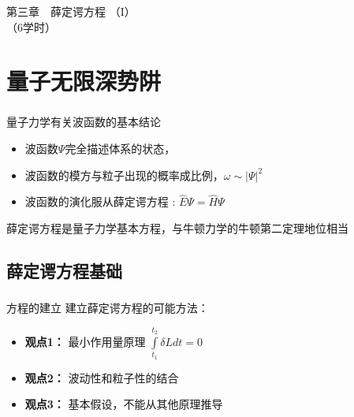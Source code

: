 \begin{frame}
		\frametitle{}
	    \begin{center}
		{ {\Huge 第三章~~薛定谔方程 （I）\\（6学时）}}
	    \end{center}    
\end{frame}
\section{量子无限深势阱}
\begin{frame}
	\frametitle{}  
	\begin{block}	{量子力学有关波函数的基本结论}
	\begin{itemize}
		\item 	波函数$\Psi$完全描述体系的状态，
		\item 	波函数的模方与粒子出现的概率成比例，$\omega \sim |\Psi|^2$
		\item 	波函数的演化服从薛定谔方程 : $\hat{E} \Psi = \hat{H}  \Psi $ 
	\end{itemize}
	薛定谔方程是量子力学基本方程，与牛顿力学的牛顿第二定理地位相当
	\end{block}	
\end{frame}

\subsection{薛定谔方程基础}
\begin{frame}
	\frametitle{}
	\begin{alertblock} {方程的建立}  
		建立薛定谔方程的可能方法：\\
		\begin{itemize}
			\item 	\textbf{ 观点1：}  最小作用量原理 $\int\limits_{t_1}^{t_2} \delta L d t =0 $\\ 
			\item 	\textbf{ 观点2：}  波动性和粒子性的结合\\ 
			\item 	\textbf{ 观点3：}  基本假设，不能从其他原理推导 \\
		\end{itemize}
	\end{alertblock}
\end{frame}

